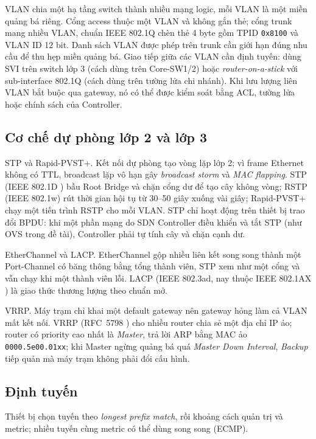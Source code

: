 VLAN chia một hạ tầng switch thành nhiều mạng logic, mỗi VLAN là một miền quảng bá riêng. Cổng access thuộc một VLAN và không gắn thẻ; cổng trunk mang nhiều VLAN, chuẩn IEEE 802.1Q \citep{ieee8021q_2018} chèn thẻ 4 byte gồm TPID \texttt{0x8100} và VLAN ID 12 bit. Danh sách VLAN được phép trên trunk cần giới hạn đúng nhu cầu để thu hẹp miền quảng bá. Giao tiếp giữa các VLAN cần định tuyến: dùng SVI trên switch lớp 3 (cách dùng trên Core-SW1/2) hoặc \textit{router-on-a-stick} với sub-interface 802.1Q (cách dùng trên tường lửa chi nhánh). Khi lưu lượng liên VLAN bắt buộc qua gateway, nó có thể được kiểm soát bằng ACL, tường lửa hoặc chính sách của Controller.

\subsection{Cơ chế dự phòng lớp 2 và lớp 3}

STP và Rapid-PVST+. Kết nối dự phòng tạo vòng lặp lớp 2; vì frame Ethernet không có TTL, broadcast lặp vô hạn gây \textit{broadcast storm} và \textit{MAC flapping}. STP (IEEE 802.1D \citep{ieee8021d_2004}) bầu Root Bridge và chặn cổng dư để tạo cây không vòng; RSTP (IEEE 802.1w) rút thời gian hội tụ từ 30--50 giây xuống vài giây; Rapid-PVST+ chạy một tiến trình RSTP cho mỗi VLAN. STP chỉ hoạt động trên thiết bị trao đổi BPDU: khi một phần mạng do SDN Controller điều khiển và tắt STP (như OVS trong đề tài), Controller phải tự tính cây và chặn cạnh dư.

EtherChannel và LACP. EtherChannel gộp nhiều liên kết song song thành một Port-Channel có băng thông bằng tổng thành viên, STP xem như một cổng và vẫn chạy khi một thành viên lỗi. LACP (IEEE 802.3ad, nay thuộc IEEE 802.1AX \citep{ieee8021ax_2020}) là giao thức thương lượng theo chuẩn mở.

VRRP. Máy trạm chỉ khai một default gateway nên gateway hỏng làm cả VLAN mất kết nối. VRRP (RFC~5798 \citep{rfc5798_vrrpv3}) cho nhiều router chia sẻ một địa chỉ IP ảo; router có priority cao nhất là \textit{Master}, trả lời ARP bằng MAC ảo \texttt{0000.5e00.01xx}; khi Master ngừng quảng bá quá \textit{Master Down Interval}, \textit{Backup} tiếp quản mà máy trạm không phải đổi cấu hình.

\subsection{Định tuyến}

Thiết bị chọn tuyến theo \textit{longest prefix match}, rồi khoảng cách quản trị và metric; nhiều tuyến cùng metric có thể dùng song song (ECMP).

